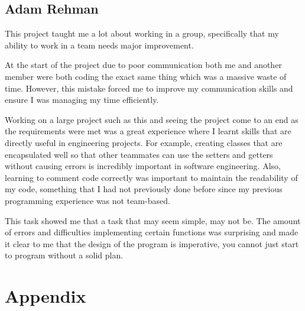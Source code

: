 \documentclass[12pt,a4paper]{article}
\begin{document}
\subsection{Adam Rehman}
This project taught me a lot about working in a group, specifically that my ability to work in a team needs major improvement.
\par
At the start of the project due to poor communication both me and another member were both coding the exact same thing which 
was a massive waste of time. However, this mistake forced me to improve my communication skills and ensure I was managing my 
time efficiently.
\par
Working on a large project such as this and seeing the project come to an end as the requirements were met was a great experience 
where I learnt skills that are directly useful in engineering projects. For example, creating classes that are encapsulated well 
so that other teammates can use the setters and getters without causing errors is incredibly important in software engineering.
Also, learning to comment code correctly was important to maintain the readability of my code, something that I had not previously 
done before since my previous programming experience was not team-based.
\par
This task showed me that a task that may seem simple, may not be. The amount of errors and difficulties implementing certain 
functions was surprising and made it clear to me that the design of the program is imperative, you cannot just start to program 
without a solid plan.

\pagebreak
\section{Appendix}
\end{document}
